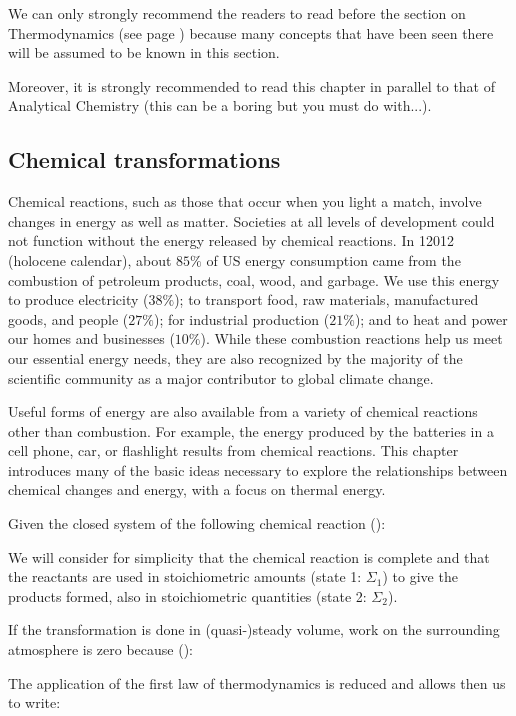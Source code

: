 	We can only strongly recommend the readers to read before the section on Thermodynamics (see page \pageref{thermodynamics}) because many concepts that have been seen there will be assumed to be known in this section.
	
	Moreover, it is strongly recommended to read this chapter in parallel to that of Analytical Chemistry (this can be a boring but you must do with...).
	
	\subsection{Chemical transformations}
	Chemical reactions, such as those that occur when you light a match, involve changes in energy as well as matter. Societies at all levels of development could not function without the energy released by chemical reactions. In 12012 (holocene calendar), about $85\%$ of US energy consumption came from the combustion of petroleum products, coal, wood, and garbage. We use this energy to produce electricity ($38\%$); to transport food, raw materials, manufactured goods, and people ($27\%$); for industrial production ($21\%$); and to heat and power our homes and businesses ($10\%$). While these combustion reactions help us meet our essential energy needs, they are also recognized by the majority of the scientific community as a major contributor to global climate change.

	Useful forms of energy are also available from a variety of chemical reactions other than combustion. For example, the energy produced by the batteries in a cell phone, car, or flashlight results from chemical reactions. This chapter introduces many of the basic ideas necessary to explore the relationships between chemical changes and energy, with a focus on thermal energy.

	Given the closed system of the following chemical reaction ():
	
	We will consider for simplicity that the chemical reaction is complete and that the reactants are used in stoichiometric amounts (state 1: $\Sigma_1$) to give the products formed, also in stoichiometric quantities (state 2: $\Sigma_2$).
	
	If the transformation is done in (quasi-)steady volume, work on the surrounding atmosphere is zero because ():
	
	The application of the first law of thermodynamics is reduced and allows then us to write:
	

